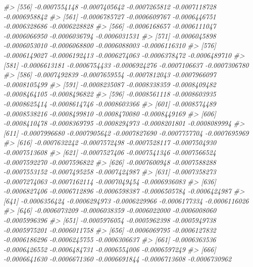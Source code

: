 \documentclass[
]{article}
\newenvironment{Shaded}{\begin{snugshade}}{\end{snugshade}}
\newcommand{\CommentTok}[1]{\textcolor[rgb]{0.56,0.35,0.01}{\textit{#1}}}
\begin{document}
\begin{Shaded}
\begin{Highlighting}[]
\CommentTok{\#\textgreater{} [556] {-}0.0007554148 {-}0.0007405642 {-}0.0007265812 {-}0.0007118728 {-}0.0006958842}
\CommentTok{\#\textgreater{} [561] {-}0.0006785727 {-}0.0006609767 {-}0.0006446751 {-}0.0006328686 {-}0.0006228828}
\CommentTok{\#\textgreater{} [566] {-}0.0006168657 {-}0.0006111047 {-}0.0006066950 {-}0.0006036794 {-}0.0006031531}
\CommentTok{\#\textgreater{} [571] {-}0.0006045898 {-}0.0006053010 {-}0.0006068800 {-}0.0006088003 {-}0.0006116310}
\CommentTok{\#\textgreater{} [576] {-}0.0006149027 {-}0.0006192413 {-}0.0006274063 {-}0.0006378472 {-}0.0006489710}
\CommentTok{\#\textgreater{} [581] {-}0.0006613181 {-}0.0006754433 {-}0.0006924276 {-}0.0007106637 {-}0.0007306780}
\CommentTok{\#\textgreater{} [586] {-}0.0007492839 {-}0.0007659554 {-}0.0007812043 {-}0.0007966097 {-}0.0008105499}
\CommentTok{\#\textgreater{} [591] {-}0.0008235087 {-}0.0008338359 {-}0.0008409482 {-}0.0008464105 {-}0.0008496822}
\CommentTok{\#\textgreater{} [596] {-}0.0008561118 {-}0.0008603935 {-}0.0008625414 {-}0.0008614746 {-}0.0008603366}
\CommentTok{\#\textgreater{} [601] {-}0.0008574489 {-}0.0008538216 {-}0.0008499810 {-}0.0008470080 {-}0.0008449169}
\CommentTok{\#\textgreater{} [606] {-}0.0008410478 {-}0.0008369795 {-}0.0008294973 {-}0.0008201801 {-}0.0008089994}
\CommentTok{\#\textgreater{} [611] {-}0.0007996680 {-}0.0007905642 {-}0.0007827690 {-}0.0007757704 {-}0.0007695969}
\CommentTok{\#\textgreater{} [616] {-}0.0007632242 {-}0.0007572498 {-}0.0007528117 {-}0.0007504930 {-}0.0007513608}
\CommentTok{\#\textgreater{} [621] {-}0.0007527406 {-}0.0007541346 {-}0.0007566524 {-}0.0007592270 {-}0.0007596822}
\CommentTok{\#\textgreater{} [626] {-}0.0007600948 {-}0.0007588288 {-}0.0007553152 {-}0.0007495258 {-}0.0007424987}
\CommentTok{\#\textgreater{} [631] {-}0.0007358273 {-}0.0007274063 {-}0.0007162114 {-}0.0007049454 {-}0.0006936083}
\CommentTok{\#\textgreater{} [636] {-}0.0006827406 {-}0.0006712896 {-}0.0006598387 {-}0.0006505784 {-}0.0006424987}
\CommentTok{\#\textgreater{} [641] {-}0.0006356424 {-}0.0006294973 {-}0.0006229966 {-}0.0006177334 {-}0.0006116026}
\CommentTok{\#\textgreater{} [646] {-}0.0006073209 {-}0.0006038359 {-}0.0006022000 {-}0.0006008060 {-}0.0005996396}
\CommentTok{\#\textgreater{} [651] {-}0.0005976054 {-}0.0005962398 {-}0.0005949738 {-}0.0005975201 {-}0.0006011758}
\CommentTok{\#\textgreater{} [656] {-}0.0006069795 {-}0.0006127832 {-}0.0006186296 {-}0.0006245755 {-}0.0006306637}
\CommentTok{\#\textgreater{} [661] {-}0.0006363536 {-}0.0006426552 {-}0.0006484731 {-}0.0006554006 {-}0.0006597249}
\CommentTok{\#\textgreater{} [666] {-}0.0006641630 {-}0.0006671360 {-}0.0006691844 {-}0.0006713608 {-}0.0006730962}

\end{Highlighting}
\end{Shaded}
\end{document}
